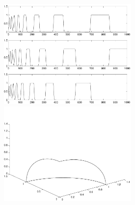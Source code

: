 \documentclass{ximera}
\begin{document}
\begin{computerExercise}
\begin{solution}
\begin{figure}[htb]
     \centerline{%
     \includegraphics[width=2.7in]{exfigure/figf14_6_4.pdf}
     \includegraphics[width=2.7in]{exfigure/figf14_6_4a.pdf}}
\end{figure}

\end{solution}
\end{computerExercise}
\end{document}
